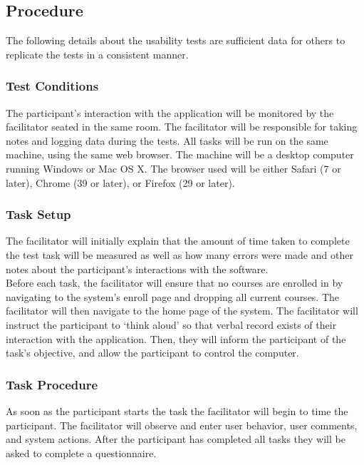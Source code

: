 \documentclass[10pt]{article}
\begin{document}
\begin{multicols}{2}
\subsection*{Procedure}
The following details about the usability tests are sufficient data for others to replicate the tests in a consistent manner.
 
\subsubsection*{Test Conditions}
The participant's interaction with the application will be monitored by the facilitator seated in the same room. The facilitator will be responsible for taking notes and logging data during the tests. All tasks will be run on the same machine, using the same web browser. The machine will be a desktop computer running Windows or Mac OS X. The browser used will be either Safari (7 or later), Chrome (39 or later), or Firefox (29 or later).

\subsubsection*{Task Setup}
The facilitator will initially explain that the amount of time taken to complete the test task will be measured as well as how many errors were made and other notes about the participant's interactions with the software.\\

Before each task, the facilitator will ensure that no courses are enrolled in by navigating to the system's enroll page and dropping all current courses. The facilitator will then navigate to the home page of the system. The facilitator will instruct the participant to `think aloud' so that verbal record exists of their interaction with the application. Then, they will  inform the participant of the task's objective, and allow the participant to control the computer.

\subsubsection*{Task Procedure}
As soon as the participant starts the task the facilitator will begin to time the participant. The facilitator will observe and enter user behavior, user comments, and system actions. After the participant has completed all tasks they will be asked to complete a questionnaire.


\end{multicols}
\end{document}
